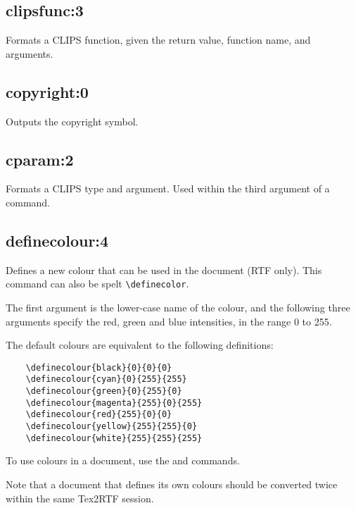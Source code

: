 \subsection*{clipsfunc:3}\label{clipsfunc}

Formats a CLIPS function, given the return value, function name, and
arguments.

\subsection*{copyright:0}\label{copyright}

Outputs the copyright symbol.

\subsection*{cparam:2}\label{cparam}

Formats a CLIPS type and argument. Used within the third argument of
a  command.

\subsection*{definecolour:4}\label{definecolour}

Defines a new colour that can be used in the document (RTF only). This
command can also be spelt \verb$\definecolor$.

The first argument is the lower-case name of the colour, and the following
three arguments specify the red, green and blue intensities, in the range 0 to 255.

The default colours are equivalent to the following definitions:

\begin{verbatim}
    \definecolour{black}{0}{0}{0}
    \definecolour{cyan}{0}{255}{255}
    \definecolour{green}{0}{255}{0}
    \definecolour{magenta}{255}{0}{255}
    \definecolour{red}{255}{0}{0}
    \definecolour{yellow}{255}{255}{0}
    \definecolour{white}{255}{255}{255}
\end{verbatim}

To use colours in a document, use the  and  commands.

Note that a document that defines its own colours should be converted twice within
the same Tex2RTF session.

